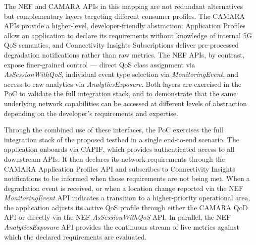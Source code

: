 The \acs{NEF} and CAMARA \acsp{API} in this mapping are not redundant alternatives but complementary layers targeting different consumer profiles. The CAMARA \acsp{API} provide a higher-level, developer-friendly abstraction: Application Profiles allow an application to declare its requirements without knowledge of internal \acs{5G} \acs{QoS} semantics, and Connectivity Insights Subscriptions deliver pre-processed degradation notifications rather than raw metrics. The \acs{NEF} \acsp{API}, by contrast, expose finer-grained control — direct \acs{QoS} class assignment via \textit{AsSessionWithQoS}, individual event type selection via \textit{MonitoringEvent}, and access to raw analytics via \textit{AnalyticsExposure}. Both layers are exercised in the \acs{PoC} to validate the full integration stack, and to demonstrate that the same underlying network capabilities can be accessed at different levels of abstraction depending on the developer's requirements and expertise.


Through the combined use of these interfaces, the \acs{PoC} exercises the full integration stack of the proposed testbed in a single end-to-end scenario. The application onboards via \acs{CAPIF}, which provides authenticated access to all downstream \acsp{API}. It then declares its network requirements through the CAMARA Application Profiles \acs{API} and subscribes to Connectivity Insights notifications to be informed when those requirements are not being met. When a degradation event is received, or when a location change reported via the \acs{NEF} \textit{MonitoringEvent} \acs{API} indicates a transition to a higher-priority operational area, the application adjusts its active \acs{QoS} profile through either the CAMARA \acs{QoD} \acs{API} or directly via the \acs{NEF} \textit{AsSessionWithQoS} \acs{API}. In parallel, the \acs{NEF} \textit{AnalyticsExposure} \acs{API} provides the continuous stream of live metrics against which the declared requirements are evaluated.

